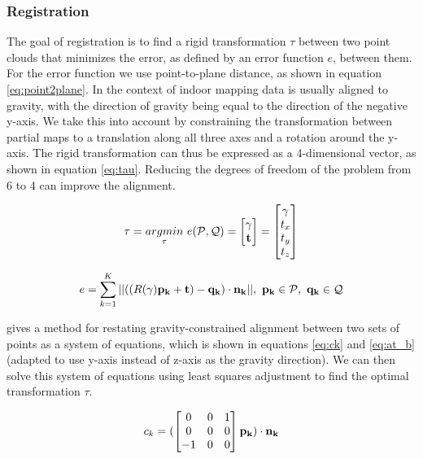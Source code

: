 \subsubsection{Registration}

The goal of registration is to find a rigid transformation \(\tau\) between two point clouds that minimizes the error, as defined by an error function \(e\), between them. For the error function we use point-to-plane distance, as shown in equation \ref{eq:point2plane}. In the context of indoor mapping data is usually aligned to gravity, with the direction of gravity being equal to the direction of the negative y-axis. We take this into account by constraining the transformation between partial maps to a translation along all three axes and a rotation around the y-axis. The rigid transformation can thus be expressed as a 4-dimensional vector, as shown in equation \ref{eq:tau}. Reducing the degrees of freedom of the problem from 6 to 4 can improve the alignment.


\begin{equation}
    \label{eq:tau}
    \tau = \underset{\tau}{argmin} \ e (\mathcal{P},\mathcal{Q}) = \begin{bmatrix}
        \gamma \\
        \bf{t}
    \end{bmatrix} = \begin{bmatrix}
        \gamma \\
        t_x    \\
        t_y    \\
        t_z
    \end{bmatrix}
\end{equation}

\begin{equation}
    \label{eq:point2plane}
    e = \sum_{k=1}^{K} || ((R(\gamma)\bf{p_k} + \bf{t}) - \bf{q_k})  \cdot \bf{n_k}||,\ \bf{p_k} \in \mathcal{P},\ \bf{q_k} \in \mathcal{Q}
\end{equation}

\cite{kubelka_gravity-constrained_2022} gives a method for restating gravity-constrained alignment between two sets of points as a system of equations, which is shown in equations \ref{eq:ck} and \ref{eq:at_b} (adapted to use y-axis instead of z-axis as the gravity direction). We can then solve this system of equations using least squares adjustment to find the optimal transformation \(\tau\).

\begin{equation}
    \label{eq:ck}
    c_k = (\begin{bmatrix}
        0  & 0 & 1 \\
        0  & 0 & 0 \\
        -1 & 0 & 0 \\
    \end{bmatrix} \bf{p_k}) \cdot \bf{n_k}
\end{equation}

